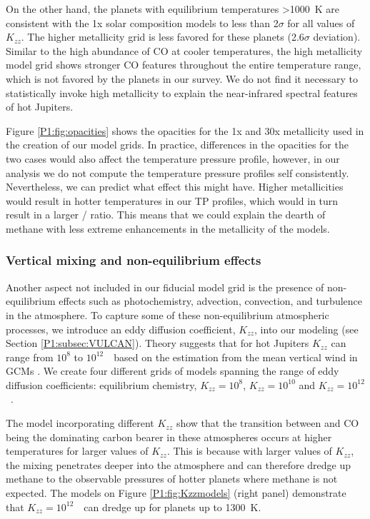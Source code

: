 On the other hand, the planets with equilibrium temperatures >1000~K are consistent with the 1x solar composition models to less than 2$\sigma$ for all values of $K_{zz}$. The higher metallicity grid is less favored for these planets (2.6$\sigma$ deviation). Similar to the high abundance of CO at cooler temperatures, the high metallicity model grid shows stronger CO features throughout the entire temperature range, which is not favored by the planets in our survey. We do not find it necessary to statistically invoke high metallicity to explain the near-infrared spectral features of hot Jupiters.

Figure \ref{P1:fig:opacities} shows the opacities for the 1x and 30x metallicity used in the creation of our model grids. In practice, differences in the opacities for the two cases would also affect the temperature pressure profile, however, in our analysis we do not compute the temperature pressure profiles self consistently. Nevertheless, we can predict what effect this might have. Higher metallicities would result in hotter temperatures in our TP profiles, which would in turn result in a larger / ratio. This means that we could explain the dearth of methane with less extreme enhancements in the metallicity of the models.

\subsubsection{Vertical mixing and non-equilibrium effects}
\label{P1:sec:Kzzdisc}

Another aspect not included in our fiducial model grid is the presence of non-equilibrium effects such as photochemistry, advection, convection, and turbulence in the atmosphere. To capture some of these non-equilibrium atmospheric processes, we introduce an eddy diffusion coefficient, $K_{zz}$, into our modeling (see Section \ref{P1:subsec:VULCAN}). Theory suggests that for hot Jupiters $K_{zz}$ can range from $10^8$ to $10^{12}$~\cmcms~based on the estimation from the mean vertical wind in GCMs \citep{Moses2011}. We create four different grids of models spanning the range of eddy diffusion coefficients: equilibrium chemistry, $K_{zz} = 10^8$, $K_{zz} = 10^{10}$ and $K_{zz} = 10^{12}$~\cmcms.

The model incorporating different $K_{zz}$ show that the transition between  and CO being the dominating carbon bearer in these atmospheres occurs at higher temperatures for larger values of $K_{zz}$. This is because with larger values of $K_{zz}$, the mixing penetrates deeper into the atmosphere and can therefore dredge up methane to the observable pressures of hotter planets where methane is not expected. The models on Figure \ref{P1:fig:Kzzmodels} (right panel) demonstrate that $K_{zz} = 10^{12}$~\cmcms~can dredge up  for planets up to 1300~K.


